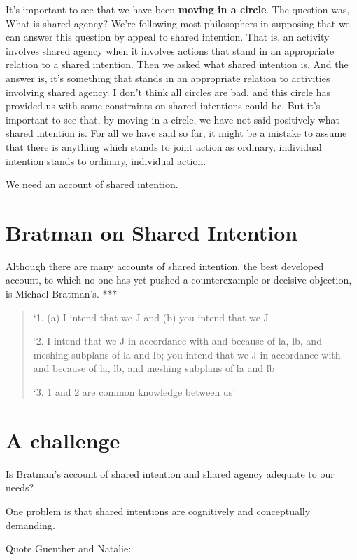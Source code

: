 \documentclass[12pt,\papersize]{extarticle}
\begin{document}
It's important to see that we have been \textbf{moving in a circle}.
The question was, What is shared agency?  
We're following most philosophers in supposing that we can answer this question by appeal to shared intention.
That is, an activity involves shared agency when it involves actions that stand in an appropriate relation to a shared intention.  
Then we asked what  shared intention is.  
And the answer is, it’s something that stands in an appropriate relation to activities involving shared agency.  
I don’t think all circles are bad, and this circle has provided us with some constraints on shared intentions could be.
But it's important to see that, by moving in a circle, we have not said positively what shared intention is.
For all we have said so far, it might be a mistake to assume that there is anything which stands to joint action as ordinary, individual intention stands to ordinary, individual action.

We need an account of shared intention.


\section{Bratman on Shared Intention}
Although there are many accounts of shared intention,
the best developed account,
to which no one has yet pushed a counterexample or decisive objection,
is Michael Bratman's.
***

\begin{quote}
\label{quote:bratman_account}
`1. (a) I intend that we J and (b) you intend that we J
 
`2. I intend that we J in accordance with and because of la, lb, and meshing subplans of la and lb; you intend that we J in accordance with and because of la, lb, and meshing subplans of la and lb
 
`3. 1 and 2 are common knowledge between us' \citep[][p.\ View 4]{Bratman:1993je}
\end{quote}
%



\section{A challenge}
\label{sec:objection_to_bratman}
Is Bratman's account of shared intention and shared agency adequate to our needs?

One problem is that shared intentions are cognitively and conceptually demanding.

Quote Guenther and Natalie:
%
\end{document}
